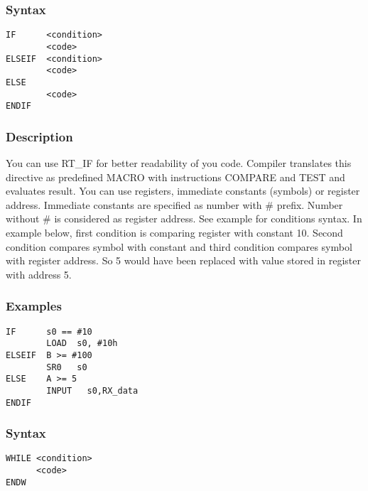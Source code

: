     \subsubsection{Syntax}
        \verb'IF      <condition>'\\
        \verb'        <code>'\\
        \verb'ELSEIF  <condition>'\\
        \verb'        <code>'\\
        \verb'ELSE'\\
        \verb'        <code>'\\
        \verb'ENDIF'

    \subsubsection{Description}
        You can use RT\_IF for better readability of you code. Compiler translates this directive as predefined MACRO with instructions COMPARE and TEST and evaluates result. You can use registers, immediate constants (symbols) or register address. Immediate constants are specified as number with \# prefix. Number without \# is considered as register address. See example for conditions syntax. In example below, first condition is comparing register with constant 10. Second condition compares symbol with constant and third condition compares symbol with register address. So 5 would have been replaced with value stored in register with address 5.

    \subsubsection{Examples}
        \verb'IF      s0 == #10'\\
        \verb'        LOAD  s0, #10h'\\
        \verb'ELSEIF  B >= #100'\\
        \verb'        SR0   s0'\\
        \verb'ELSE    A >= 5'\\
        \verb'        INPUT   s0,RX_data'\\
        \verb'ENDIF'

    \subsubsection{Syntax}
        \verb'WHILE <condition>'\\
        \verb'      <code>'\\
        \verb'ENDW'

